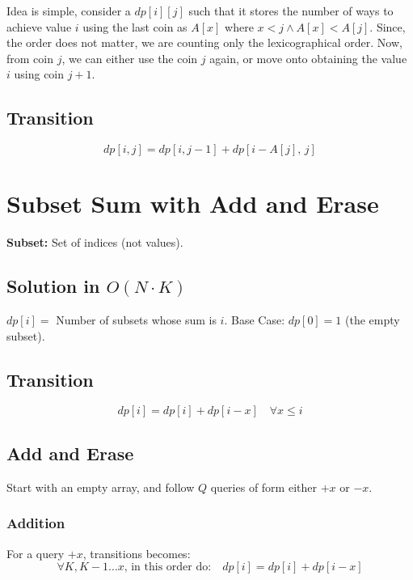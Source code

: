 \documentclass{article}
\begin{document}
	Idea is simple, consider a $dp[i][j]$ such that it stores the number of ways
	to achieve value $i$ using the last coin as $A[x]$ where $x < j \land A[x] < A[j]$. Since, the order does not matter, we are counting only the lexicographical order. Now, from coin $j$, we can either use the coin $j$ again, or move onto obtaining the value $i$ using coin $j+1$.
	
	\subsection{Transition}
	\[
		dp[i,j] = dp[i, j-1] + dp[i-A[j], \,j] 
	\]
	
	\section{Subset Sum with Add and Erase}
		\begin{algorithm}[H]
		\SetAlgoLined
		\caption{Problem: Subset Sum}
	\end{algorithm}
	\vspace{5mm}
	
	\textbf{Subset:} Set of indices (not values).
	
	\subsection{Solution in $O(N \cdot K)$}
	
	$dp[i] = $ Number of subsets whose sum is $i$. Base Case: $dp[0] = 1$ (the empty subset).
	
	\subsection{Transition}
	
	\[
	dp[i] = dp[i] + dp[i-x] \quad \forall x \leq i
	\]
	
	\subsection{Add and Erase}
	Start with an empty array, and follow $Q$ queries of form either $+x$ or $-x$.
	\subsubsection{Addition}
	For a query $+x$, transitions becomes:
	\[
	\forall K, K-1 \ldots x, \, \text{in this order do:} \quad dp[i] = dp[i] + dp[i-x] 
	\]
	
\end{document}
